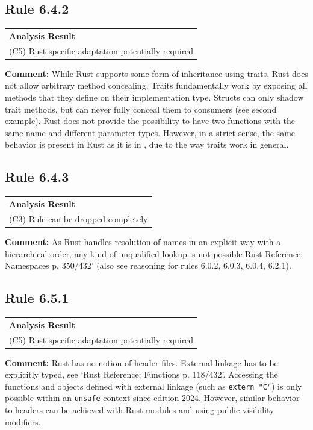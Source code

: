 \subsection*{Rule 6.4.2}
\begin{longtable}{p{13cm}}
\textbf{Analysis Result} \\
(C5) Rust-specific adaptation potentially required \\
\end{longtable}
\textbf{Comment:} While Rust supports some form of inheritance using traits, Rust does not allow arbitrary method concealing. Traits fundamentally work by exposing all methods that they define on their implementation type. Structs can only shadow trait methods, but can never fully conceal them to consumers (see second example). Rust does not provide the possibility to have two functions with the same name and different parameter types. However, in a strict sense, the same behavior is present in Rust as it is in \Cpp, due to the way traits work in general. \\


\subsection*{Rule 6.4.3}
\begin{longtable}{p{13cm}}
\textbf{Analysis Result} \\
(C3) Rule can be dropped completely \\
\end{longtable}
\textbf{Comment:} As Rust handles resolution of names in an explicit way with a hierarchical order, any kind of unqualified lookup is not possible Rust Reference: Namespaces p. 350/432' (also see reasoning for rules 6.0.2, 6.0.3, 6.0.4, 6.2.1). \\
\subsection*{Rule 6.5.1}
\begin{longtable}{p{13cm}}
\textbf{Analysis Result} \\
(C5) Rust-specific adaptation potentially required \\
\end{longtable}
\textbf{Comment:} Rust has no notion of header files. External linkage has to be explicitly typed, see `Rust Reference: Functions p. 118/432'. Accessing the functions and objects defined with external linkage (such as \texttt{extern "C"}) is only possible within an \texttt{unsafe} context since edition 2024. However, similar behavior to headers can be achieved with Rust modules and using public visibility modifiers. \\


